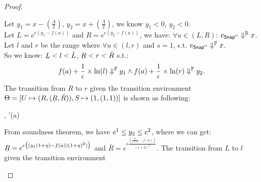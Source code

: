 \documentclass[a4paper,11pt]{article}
\begin{document}
\begin{proof}
\begin{itemize}
		Let $y_1 = x - (\frac{\Lambda}{2})$, $y_2 = x + (\frac{\Lambda}{2})$, we know $y_1 < 0$, $y_2 < 0$.
		\\
		Let $L = e^{\epsilon(y_1 - f(a))}$ and $R = e^{\epsilon(y_2 - f(a))}$, we have: $\forall u \in (L, R)$:
		$e_{\mathsf{Snap}''} \Downarrow^{\mathbb{R}} x$.
		\\
		Let $l$ and $r$ be the range where $\forall u \in (l, r)$ and $s = 1$, s.t.
		$e_{\mathsf{Snap}''} \Downarrow^{\mathbb{F}} x$.
		\\
		So we know: $\ubar{L} < l < \bar{L}$, $\ubar{R} < r < \bar{R}$ s.t.:
		$$f(a) + \frac{1}{\epsilon} \times \ln(l) \Downarrow^{\mathbb{F}} y_1
		\land
		f(a) + \frac{1}{\epsilon} \times \ln(r) \Downarrow^{\mathbb{F}} y_2.$$
		The transition from $R$ to $r$ given the transition environment 
		$\trsenv = [U \mapsto (R, (\ubar{R}, \bar{R})), S \mapsto (1, (1, 1))]$ is shown as following:
		\begin{mathpar}
		{
			{
				{
					{
						\trsenv, \snap'(a)
						\trsto
					}
				}
			}
		}
		\end{mathpar}
		From soundness theorem, we have  $e^1 \leq y_2 \leq e^2$, where we can get:
		\\ 
		$\ubar{R} = e^{\epsilon 
				\big( (y_1(1 + \eta) - f(a)) (1 + \eta)^2) \big)}$ and
		$\bar{R} = e^{\epsilon 
				\frac{(\frac{y_1}{1 + \eta} - f(a))}{(1 + \eta)^2}}$.
		The transition from $L$ to $l$ given the transition environment 

\end{itemize}
\end{proof}
\end{document}
